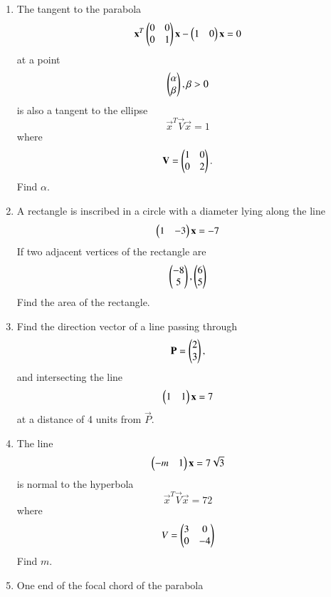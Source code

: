 \documentclass[journal,12pt,twocolumn]{IEEEtran}
\begin{document}
\begin{enumerate}[label=\arabic*.]
\begin{enumerate}
\end{enumerate}
\item The tangent to the parabola 
\begin{equation}
\mathbf{x}^T\begin{pmatrix}0 & 0 \\ 0 & 1\end{pmatrix}\mathbf{x} - \begin{pmatrix}1 & 0\end{pmatrix}\mathbf{x}  =0
\end{equation}
%
at a point 
\begin{equation}
\begin{pmatrix} \alpha \\ \beta \end{pmatrix}, \beta > 0
\end{equation}
%
is also a tangent to the ellipse 
\begin{equation}
\vec{x}^T\vec{V}\vec{x} =1
\end{equation}
%
where
\begin{equation}
\mathbf{V} = \begin{pmatrix}1 & 0 \\ 0 & 2\end{pmatrix}.
\end{equation}
Find $\alpha$.
\item A rectangle is inscribed in a circle with a diameter lying along the line 
\begin{equation}
\begin{pmatrix}1 & -3 \end{pmatrix}\mathbf{x}  =-7
\end{equation}
If two adjacent vertices of the rectangle are 
\begin{equation}
\begin{pmatrix} -8 \\ 5 \end{pmatrix},
\begin{pmatrix} 6\\ 5 \end{pmatrix}
\end{equation}
%
Find the area of the rectangle.
\item Find the direction vector of a line passing through 
\begin{equation}
\mathbf{P}= \begin{pmatrix} 2 \\ 3 \end{pmatrix},
\end{equation}
%
and intersecting the line 
\begin{equation}
\begin{pmatrix}1 & 1 \end{pmatrix}\mathbf{x}  =7
\end{equation}
%
at a distance of 4 units from $\vec{P}$.
\item The line 
\begin{equation}
\begin{pmatrix}-m & 1 \end{pmatrix}\mathbf{x}  =7\sqrt{3}
\end{equation}
%
is normal to the hyperbola
\begin{equation}
\vec{x}^T\vec{V}\vec{x} = 72
\end{equation}
%
where
\begin{equation}
V = \begin{pmatrix}3 & 0 \\ 0 & -4\end{pmatrix}
\end{equation}
Find $m$.
\item One end of the focal chord of the parabola

\end{enumerate}
\end{document}
